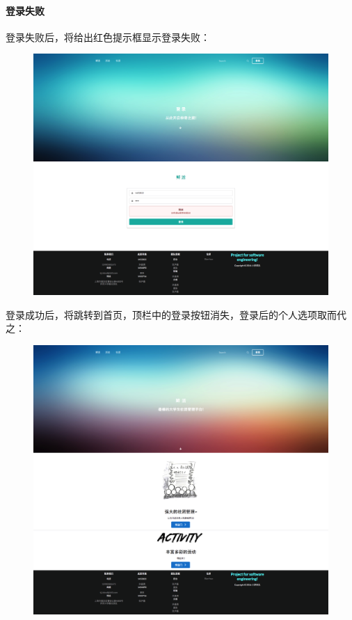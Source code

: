 \documentclass[UTF8]{ctexart}
\begin{document}
\paragraph{登录失败}
登录失败后，将给出红色提示框显示登录失败：\\
\begin{figure}[H]
\centering
\includegraphics[width = .8\textwidth]{login-error.png}
\end{figure}
登录成功后，将跳转到首页，顶栏中的登录按钮消失，登录后的个人选项取而代之：\\
\begin{figure}[H]
\centering
\includegraphics[width = .8\textwidth]{web-index.png}
\end{figure}
\end{document}
